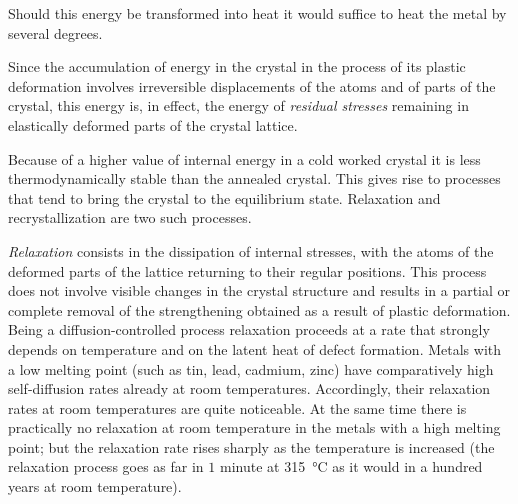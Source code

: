 \begin{table}[!b]
	\renewcommand{\arraystretch}{1.2}
	\caption{}
	\vspace{-0.6cm}
	\label{table:2_3}
	\begin{center}\end{center}
\end{table}

Should this energy be transformed into heat it would suffice to heat the metal by several degrees.

Since the accumulation of energy in the crystal in the process of its plastic deformation involves irreversible displacements of the atoms and of parts of the crystal, this energy is, in effect, the energy of \textit{residual stresses} remaining in elastically deformed parts of the crystal lattice.

Because of a higher value of internal energy in a cold worked crystal it is less thermodynamically stable than the annealed crystal. This gives rise to processes that tend to bring the crystal to the equilibrium state. Relaxation and recrystallization are two such processes.

\textit{Relaxation} consists in the dissipation of internal stresses, with the atoms of the deformed parts of the lattice returning to their regular positions. This process does not involve visible changes in the crystal structure and results in a partial or complete removal of the strengthening obtained as a result of plastic deformation. Being a diffusion-controlled process relaxation proceeds at a rate that strongly depends on temperature and on the latent heat of defect formation. Metals with a low melting point (such as tin, lead, cadmium, zinc) have comparatively high self-diffusion rates already at room temperatures. Accordingly, their relaxation rates at room temperatures are quite noticeable. At the same time there is practically no relaxation at room temperature in the metals with a high melting point; but the relaxation rate rises sharply as the temperature is increased (the relaxation process goes as far in $1$ minute at \SI{315}{\degreeCelsius} as it would in a hundred years at room temperature).

